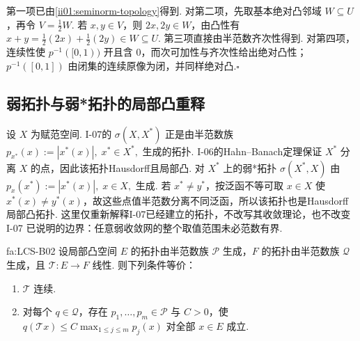 \begin{FAProof}
第一项已由\autoref{ii01:seminorm-topology}得到. 对第二项，先取基本绝对凸邻域 \(\displaystyle W\subseteq U\)，再令 \(\displaystyle V=\frac12W\). 若 \(\displaystyle x,y\in V\)，则 \(\displaystyle2x,2y\in W\)，由凸性有 \(\displaystyle x+y=\frac12(2x)+\frac12(2y)\in W\subseteq U\). 第三项直接由半范数齐次性得到. 对第四项，连续性使 \(\displaystyle p^{-1}([0,1))\) 开且含 \(\displaystyle0\)，而次可加性与齐次性给出绝对凸性；\(\displaystyle p^{-1}([0,1])\) 由闭集的连续原像为闭，并同样绝对凸.\hfill\(\square\)
\end{FAProof}

\subsection{弱拓扑与弱*拓扑的局部凸重释}

设 \(\displaystyle X\) 为赋范空间. I-07的 \(\displaystyle \sigma(X,X^*)\) 正是由半范数族
\(\displaystyle p_{x^*}(x):=|x^*(x)|,\; x^*\in X^*,\)
生成的拓扑. I-06的Hahn--Banach定理保证 \(\displaystyle X^*\) 分离 \(\displaystyle X\) 的点，因此该拓扑Hausdorff且局部凸. 对 \(\displaystyle X^*\) 上的弱*拓扑 \(\displaystyle \sigma(X^*,X)\) 由
\(\displaystyle p_x(x^*):=|x^*(x)|,\; x\in X,\)
生成. 若 \(\displaystyle x^*\neq y^*\)，按泛函不等可取 \(\displaystyle x\in X\) 使 \(\displaystyle x^*(x)\neq y^*(x)\)，故这些点值半范数分离不同泛函，所以该拓扑也是Hausdorff局部凸拓扑. 这里仅重新解释I-07已经建立的拓扑，不改写其收敛理论，也不改变 I-07 已说明的边界：任意弱收敛网的整个取值范围未必范数有界.

\begin{FATheorem}[B][半范数连续线性映射判据]{fa:LCS-B02}
设局部凸空间 \(\displaystyle E\) 的拓扑由半范数族 \(\displaystyle \mathcal P\) 生成，\(\displaystyle F\) 的拓扑由半范数族 \(\displaystyle \mathcal Q\) 生成，且 \(\displaystyle \mathcal T:E\to F\) 线性. 则下列条件等价：
\begin{enumerate}[label=(\roman*)]
\item \(\displaystyle \mathcal T\) 连续.
\item 对每个 \(\displaystyle q\in\mathcal Q\)，存在 \(\displaystyle p_1,\dots,p_m\in\mathcal P\) 与 \(\displaystyle C>0\)，使
\(\displaystyle q(\mathcal Tx) \leqslant C\max_{1\leqslant j\leqslant m}p_j(x)\)
对全部 \(\displaystyle x\in E\) 成立.
\end{enumerate}
\end{FATheorem}

